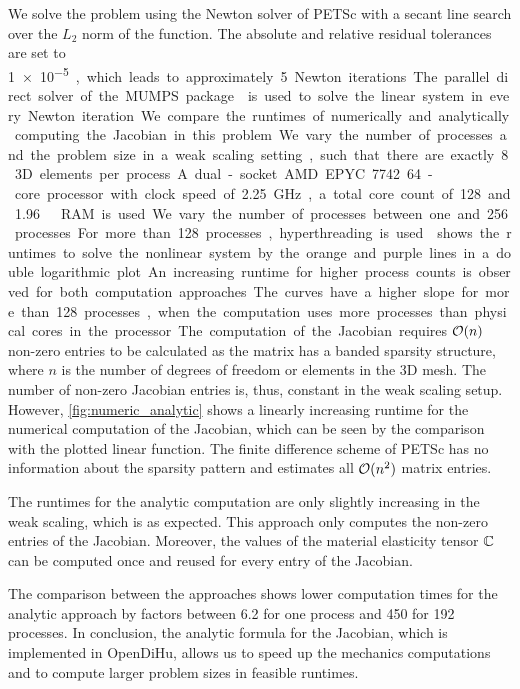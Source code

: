 We solve the problem using the Newton solver of PETSc with a secant line search over the $L_2$ norm of the function. The absolute and relative residual tolerances are set to \SI{1e-5}, which leads to approximately 5 Newton iterations. The parallel direct solver of the MUMPS package \cite{Mumps2017} is used to solve the linear system in every Newton iteration.

We compare the runtimes of numerically and analytically computing the Jacobian in this problem. We vary the number of processes and the problem size in a weak scaling setting, such that there are exactly 8 3D elements per process. A dual-socket AMD EPYC 7742 64-core processor with clock speed of \SI{2.25}{\giga\hertz}, a total core count of 128 and \SI{1.96}{\tera\byte} RAM is used. We vary the number of processes between one and 256 processes. For more than 128 processes, hyperthreading is used.

 shows the runtimes to solve the nonlinear system by the orange and purple lines in a double logarithmic plot. An increasing runtime for higher process counts is observed for both computation approaches. The curves have a higher slope for more than 128 processes, when the computation uses more processes than physical cores in the processor.

The computation of the Jacobian requires $\mathcal{O}(n)$ non-zero entries to be calculated as the matrix has a banded sparsity structure, where $n$ is the number of degrees of freedom or elements in the 3D mesh. The number of non-zero Jacobian entries is, thus, constant in the weak scaling setup.
However, \cref{fig:numeric_analytic} shows a linearly increasing runtime for the numerical computation of the Jacobian, which can be seen by the comparison with the plotted linear function. 
The finite difference scheme of PETSc has no information about the sparsity pattern and estimates all $\mathcal{O}(n^2)$ matrix entries.

The runtimes for the analytic computation are only slightly increasing in the weak scaling, which is as expected. This approach only computes the non-zero entries of the Jacobian. Moreover, the values of the material elasticity tensor $\mathbb{C}$ can be computed once and reused for every entry of the Jacobian.

The comparison between the approaches shows lower computation times for the analytic approach by factors between \num{6.2} for one process and \num{450} for 192 processes. 
In conclusion, the analytic formula for the Jacobian, which is implemented in OpenDiHu, allows us to speed up the mechanics computations and to compute larger problem sizes in feasible runtimes.

